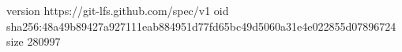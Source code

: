 version https://git-lfs.github.com/spec/v1
oid sha256:48a49b89427a927111eab884951d77fd65bc49d5060a31e4e022855d07896724
size 280997
